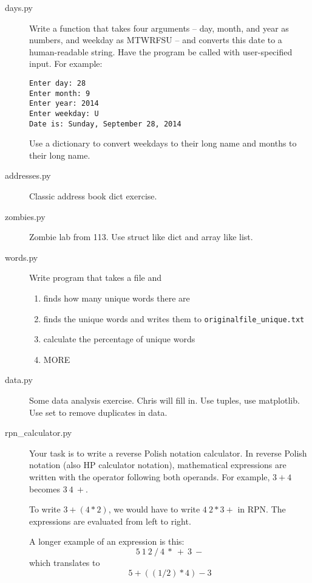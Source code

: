 \documentclass[11pt]{cselabheader}
\begin{document}
\begin{description}
  \item[days.py] Write a function that takes four arguments -- day, month, and
    year as numbers, and weekday as MTWRFSU -- and converts this date to a
    human-readable string. Have the program be called with user-specified
    input. For example:
    \begin{lstlisting}[style=bash]
Enter day: 28
Enter month: 9
Enter year: 2014
Enter weekday: U
Date is: Sunday, September 28, 2014
    \end{lstlisting}

    Use a dictionary to convert weekdays to their long name and months to their
    long name.

  \item[addresses.py] Classic address book dict exercise.

  \item[zombies.py] Zombie lab from 113. Use struct like dict and array like
    list.

  \item[words.py] Write program that takes a file and
    \begin{enumerate}
      \item finds how many unique words there are
      \item finds the unique words and writes them to
        \texttt{originalfile\_unique.txt}
      \item calculate the percentage of unique words
      \item MORE
    \end{enumerate}

  \item[data.py] Some data analysis exercise. Chris will fill in. Use tuples,
    use matplotlib. Use set to remove duplicates in data.

  \item[rpn\_calculator.py] Your task is to write a reverse Polish notation
    calculator. In reverse Polish notation (also HP
    calculator notation), mathematical expressions are written with the operator
    following both operands. For example, $3 + 4$ becomes $3~4~+$.

    To write $3 + (4 * 2)$, we would have to write $4~2 * 3 +$ in RPN. The
    expressions are evaluated from left to right.

    A longer example of an expression is this: 
    \[ 5~1~2~/~4~*~+~3~- \]
    which translates to
    \[ 5 + ( (1 / 2) * 4 ) - 3 \]


\end{description}
\end{document}
